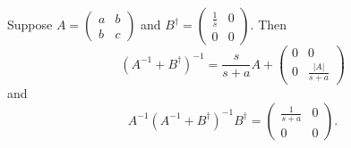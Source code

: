 \documentclass{article}
\begin{document}
\begin{fact} \label{rewrite_inverse}
Suppose $A=\left(\begin{array}{cc}a & b \\ b & c \end{array}\right)$ and $B^\dagger = \left(\begin{array}{cc} \frac{1}{s} & 0 \\ 0 & 0 \end{array}\right)$. Then 
\begin{equation}
(A^{-1}+B^\dagger)^{-1}=\frac{s}{s+a}A+\left(\begin{array}{cc}0 & 0 \\ 0 & \frac{|A|}{s+a}\end{array}\right)
\end{equation}
and
\begin{equation}
A^{-1}(A^{-1}+B^\dagger)^{-1}B^\dagger=\left(\begin{array}{cc}\frac{1}{s+a} & 0 \\ 0 & 0 \end{array}\right).
\end{equation}
\end{fact}
\end{document}
